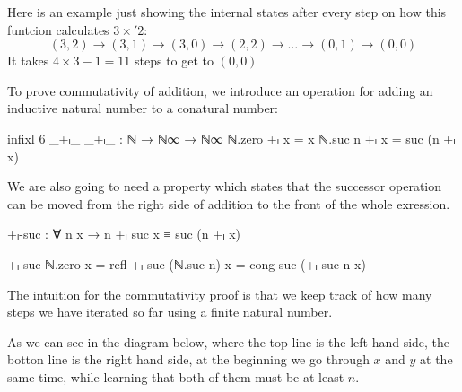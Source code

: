 Here is an example just showing the internal states after every step
on how this funtcion calculates $3 \times' 2$:
\[(3,2) \to (3,1) \to (3,0) \to (2,2) \to \dots \to (0,1) \to (0,0)\]
It takes $4 \times 3 - 1 = 11$ steps to get to $(0,0)$

To prove commutativity of addition, we introduce an operation for adding an
inductive natural number to a conatural number:
\begin{code}
infixl 6 _+ₗ_
_+ₗ_ : ℕ → ℕ∞ → ℕ∞
ℕ.zero +ₗ x = x
ℕ.suc n +ₗ x = suc (n +ₗ x)
\end{code}

We are also going to need a property which states that the successor operation
can be moved from the right side of addition to the front of the whole exression.

\begin{code}
+ₗ-suc : ∀ n x → n +ₗ suc x ≡ suc (n +ₗ x)
\end{code}
\begin{code}[hide]
+ₗ-suc ℕ.zero x = refl
+ₗ-suc (ℕ.suc n) x = cong suc (+ₗ-suc n x)
\end{code}

The intuition for the commutativity proof is that we keep track of how many steps we have
iterated so far using a finite natural number.

As we can see in the diagram below, where the top line is the left hand side,
the botton line is the right hand side, at the beginning we go through $x$ and
$y$ at the same time, while learning that both of them must be at least $n$.

\begin{center}
\end{center}

